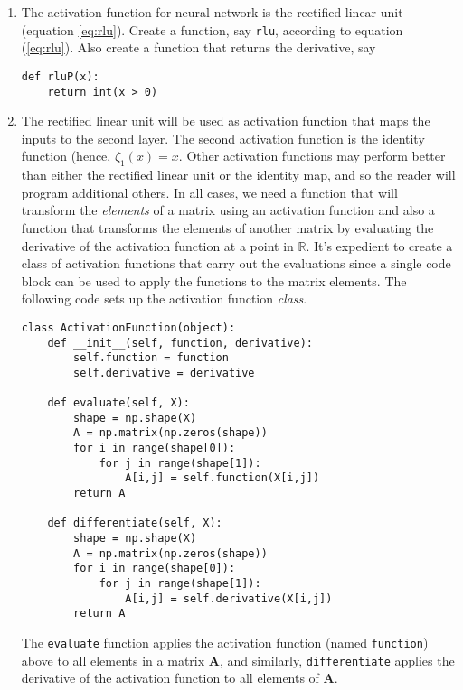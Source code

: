 \documentclass[graybox,envcountchap]{svmono}
\newcommand{\nn}{neural network}
\newcommand{\tx}{\texttt}
\begin{document}
\begin{enumerate}
 \item The activation function for {\nn } is the rectified linear unit (equation \ref{eq:rlu}). Create a function, say \tx{rlu}, according to equation (\ref{eq:rlu}). Also create a function that returns the derivative, say
 
\small 
\begin{svgraybox}
\begin{verbatim}
def rluP(x):
    return int(x > 0) 
\end{verbatim}
\end{svgraybox}
\normalsize

\item The rectified linear unit will be used as activation function that maps the inputs to the second layer. The second activation function is the identity function (hence, $\zeta_1(x) = x$. Other activation functions may perform better than either the rectified linear unit or the identity map, and so the reader will program additional others.  In all cases, we need a function that will transform the \emph{elements} of a matrix using an activation function and also a function that transforms the elements of another matrix  by evaluating the derivative of the activation function at a point in $\mathbb{R}$.  It's expedient to create a class of activation functions that carry out the evaluations since a single code block can be used to apply the functions to the matrix elements. The following code sets up the activation function \emph{class}.


\small 
\begin{svgraybox}
\begin{verbatim}
class ActivationFunction(object):
    def __init__(self, function, derivative):    
        self.function = function
        self.derivative = derivative
    
    def evaluate(self, X):
        shape = np.shape(X)
        A = np.matrix(np.zeros(shape))
        for i in range(shape[0]):    
            for j in range(shape[1]):  
                A[i,j] = self.function(X[i,j])
        return A
            
    def differentiate(self, X):
        shape = np.shape(X)
        A = np.matrix(np.zeros(shape))
        for i in range(shape[0]):    
            for j in range(shape[1]):  
                A[i,j] = self.derivative(X[i,j])
        return A
\end{verbatim}
\end{svgraybox}
\normalsize

The \tx{evaluate} function applies the activation function (named \tx{function}) above to all elements in a matrix $\mathbf{A}$, and similarly, \tx{differentiate} applies the derivative of the activation function to all elements of $\mathbf{A}$.


\end{enumerate}
\end{document}

